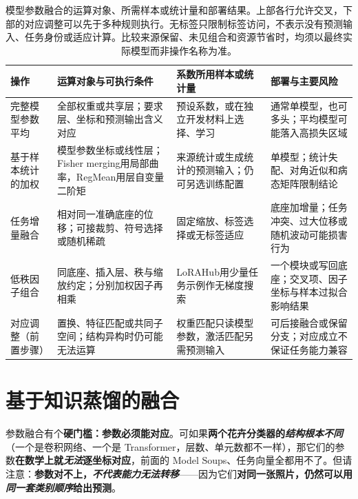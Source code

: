 \begin{table}[htbp]
  \centering
  \small
  \setlength{\tabcolsep}{4pt}
  \renewcommand{\arraystretch}{1.2}
  \begin{tabularx}{\linewidth}{@{}>{\raggedright\arraybackslash}p{24mm}
      >{\raggedright\arraybackslash}X
      >{\raggedright\arraybackslash}X
      >{\raggedright\arraybackslash}X@{}}
    \toprule
    操作 & 运算对象与可执行条件 & 系数所用样本或统计量 & 部署与主要风险 \\
    \midrule
    完整模型参数平均 & 全部权重或共享层；要求层、坐标和预测输出含义对应 & 预设系数，或在独立开发材料上选择、学习 & 通常单模型，也可多头；平均模型可能落入高损失区域 \\
    \addlinespace
    基于样本统计的加权 & 模型参数坐标或线性层；Fisher merging用局部曲率，RegMean用层自变量二阶矩 & 来源统计或生成统计的预测输入；仍可另选训练配置 & 单模型；统计失配、对角近似和病态矩阵限制结论 \\
    \addlinespace
    任务增量融合 & 相对同一准确底座的位移；可接裁剪、符号选择或随机稀疏 & 固定缩放、标签选择或无标签适应 & 底座加增量；任务冲突、过大位移或随机波动可能损害行为 \\
    \addlinespace
    低秩因子组合 & 同底座、插入层、秩与缩放约定；分别加权因子再相乘 & LoRAHub用少量任务示例作无梯度搜索 & 一个模块或写回底座；交叉项、因子坐标与样本过拟合影响结果 \\
    \midrule
    对应调整（前置步骤） & 置换、特征匹配或共同子空间；结构异构时仍可能无法运算 & 权重匹配只读模型参数，激活匹配另需预测输入 & 可后接融合或保留分支；对应成立不保证任务能力兼容 \\
    \bottomrule
  \end{tabularx}
  \caption{模型参数融合的运算对象、所需样本或统计量和部署结果。上部各行允许交叉，下部的对应调整可以先于多种规则执行。无标签只限制标签访问，不表示没有预测输入、任务身份或适应计算。比较来源保留、未见组合和资源节省时，均须以最终实际模型而非操作名称为准。}
  \label{tab:ket-integration-merging-operations}
\end{table}

\section{基于知识蒸馏的融合}
\label{sec:ket-integration-distillation}

参数融合有个\textbf{硬门槛：参数必须能对应}。可如果\textbf{两个花卉分类器的\emph{结构根本不同}}（一个是卷积网络、一个是 Transformer，层数、单元数都不一样），那它们的参数\textbf{在数学上就\emph{无法}逐坐标对应}，前面的 Model Soups、任务向量全都用不了。但请注意：\textbf{参数对不上，\emph{不代表能力无法转移}}——因为它们\textbf{对同一张照片，仍然可以用\emph{同一套类别顺序}给出预测}。

